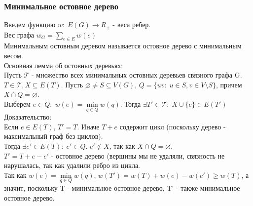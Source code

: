 \subsubsection{Минимальное остовное дерево}
Введем функцию $w: \; E(G) \rightarrow R_+$ - веса ребер.\\
Вес графа $w_G = \sum\limits_{e \in E}w(e)$\\
Минимальным остовным деревом называется остовное дерево с минимальным весом.\\
Основная лемма об остовных деревьях:\\
Пусть $\mathcal{T}$ - множество всех минимальных остовных деревьев связного графа G.\\
$T \in \mathcal{T}, X \subseteq E(T)$. Пусть $\varnothing \not= S \subseteq V(G)$, $Q = \{uv: \; u \in S, v \in V \setminus S\}$, причем $X \cap Q = \varnothing$.\\
Выберем $e \in Q: \; w(e) = \min\limits_{q \in Q}w(q)$. Тогда $\exists T' \in \mathcal{T}: \; X \cup \{e\} \in E(T')$\\
Доказательство:\\
Если $e \in E(T)$, $T' = T$. Иначе $T + e$ содержит цикл (поскольку дерево - максимальный граф без циклов).\\
Тогда $\exists e' \in E(T): \; e' \in Q$. $e' \not\in X$, так как $X \cap Q = \varnothing$.\\
$T' = T + e - e'$ - остовное дерево (вершины мы не удаляли, связность не нарушалась, так как удалили ребро из цикла.\\
Так как $w(e) = \min\limits_{q \in Q}w(q)$, $w(T') = w(T) + w(e) - w(e') \geq w(T)$, а значит, поскольку T - минимальное остовное дерево, T' - также минимальное остовное дерево.
